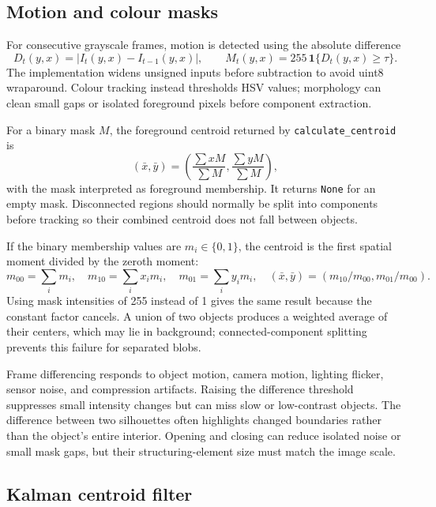 \documentclass[11pt,a4paper]{article}
\newcommand{\1}{\mathbf{1}}
\begin{document}
\subsection{Motion and colour masks}

For consecutive grayscale frames, motion is detected using the absolute
difference
\[
 D_t(y,x)=|I_t(y,x)-I_{t-1}(y,x)|,\qquad
 M_t(y,x)=255\,\1\{D_t(y,x)\ge\tau\}.
\]
The implementation widens unsigned inputs before subtraction to avoid uint8
wraparound. Colour tracking instead thresholds HSV values; morphology can
clean small gaps or isolated foreground pixels before component extraction.

For a binary mask $M$, the foreground centroid returned by
\texttt{calculate\_centroid} is
\[
  (\bar{x},\bar{y})=\left(\frac{\sum xM}{\sum M},
                         \frac{\sum yM}{\sum M}\right),
\]
with the mask interpreted as foreground membership. It returns \texttt{None} for an
empty mask. Disconnected regions should normally be split into components
before tracking so their combined centroid does not fall between objects.

If the binary membership values are $m_i\in\{0,1\}$, the centroid is the
first spatial moment divided by the zeroth moment:
\[
 m_{00}=\sum_i m_i,\quad m_{10}=\sum_i x_i m_i,\quad
 m_{01}=\sum_i y_i m_i,\quad
 (\bar{x},\bar{y})=(m_{10}/m_{00},m_{01}/m_{00}).
\]
Using mask intensities of 255 instead of 1 gives the same result because the
constant factor cancels. A union of two objects produces a weighted average
of their centers, which may lie in background; connected-component splitting
prevents this failure for separated blobs.

Frame differencing responds to object motion, camera motion, lighting flicker,
sensor noise, and compression artifacts. Raising the difference threshold
suppresses small intensity changes but can miss slow or low-contrast objects.
The difference between two silhouettes often highlights changed boundaries
rather than the object's entire interior. Opening and closing can reduce
isolated noise or small mask gaps, but their structuring-element size must
match the image scale.

\subsection{Kalman centroid filter}
\end{document}

